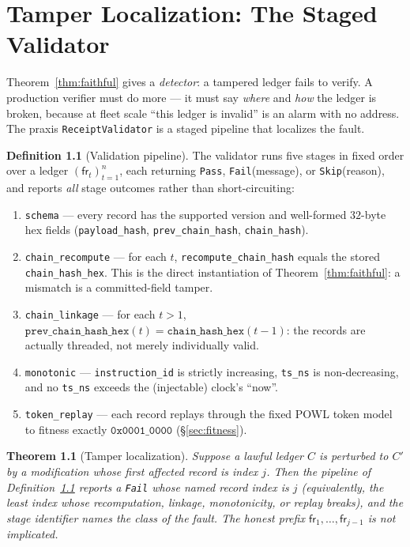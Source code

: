 \documentclass[11pt,oneside]{book}
\theoremstyle{definition}
\newtheorem{definition}{Definition}[chapter]
\theoremstyle{plain}
\newtheorem{theorem}{Theorem}[chapter]
\theoremstyle{remark}
\newcommand{\fr}{\mathsf{fr}}                   %
\newcommand{\code}[1]{\texttt{#1}}
\newcommand{\Ledger}{C}               %
\begin{document}
\chapter{Tamper Localization: The Staged Validator}
\label{ch:localize}

Theorem~\ref{thm:faithful} gives a \emph{detector}: a tampered ledger fails to verify. %
A
production verifier must do more --- it must say \emph{where} and \emph{how} the ledger is
broken, because at fleet scale ``this ledger is invalid'' is an alarm with no address. %
The
praxis \code{ReceiptValidator} is a staged pipeline that localizes the fault. %

\begin{definition}[Validation pipeline]\label{def:pipeline}
The validator runs five stages in fixed order over a ledger $(\fr_t)_{t=1}^{n}$, each returning
\code{Pass}, \code{Fail}(message), or \code{Skip}(reason), and reports \emph{all} stage
outcomes rather than short-circuiting: %
\begin{enumerate}[label=(S\arabic*),leftmargin=*]
\item \code{schema} --- every record has the supported version and well-formed
$32$-byte hex fields (\code{payload\_hash}, \code{prev\_chain\_hash}, \code{chain\_hash}). %
\item \code{chain\_recompute} --- for each $t$, \code{recompute\_chain\_hash} equals the stored
\code{chain\_hash\_hex}. %
This is the direct instantiation of Theorem~\ref{thm:faithful}: a
mismatch is a committed-field tamper. %
\item \code{chain\_linkage} --- for each $t>1$, $\code{prev\_chain\_hash\_hex}(t)=
\code{chain\_hash\_hex}(t-1)$: the records are actually threaded, not merely individually
valid. %
\item \code{monotonic} --- \code{instruction\_id} is strictly increasing, \code{ts\_ns} is
non-decreasing, and no \code{ts\_ns} exceeds the (injectable) clock's ``now''. %
\item \code{token\_replay} --- each record replays through the fixed POWL token model to
fitness exactly $\code{0x0001\_0000}$ (\S\ref{sec:fitness}). %
\end{enumerate}
\end{definition}

\begin{theorem}[Tamper localization]\label{thm:localize}
Suppose a lawful ledger $\Ledger$ is perturbed to $\Ledger'$ by a modification whose
first affected record is index $j$. %
Then the pipeline of Definition~\ref{def:pipeline} reports
a \code{Fail} whose named record index is $j$ (equivalently, the least index whose
recomputation, linkage, monotonicity, or replay breaks), and the stage identifier names the
class of the fault. %
The honest prefix $\fr_1,\dots,\fr_{j-1}$ is not implicated. %
\end{theorem}
\end{document}
